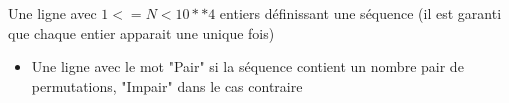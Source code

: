 \begin{Input}
    \begin{Itemize}
        \item Une ligne avec $1 <= N < 10**4$ entiers définissant une séquence (il est garanti que chaque entier apparait une unique fois)
    \end{Itemize}
\end{Input}

\begin{Output}
    \begin{itemize}
        \item Une ligne avec le mot "Pair" si la séquence contient un nombre pair de permutations, "Impair" dans le cas contraire
    \end{itemize}
\end{Output}